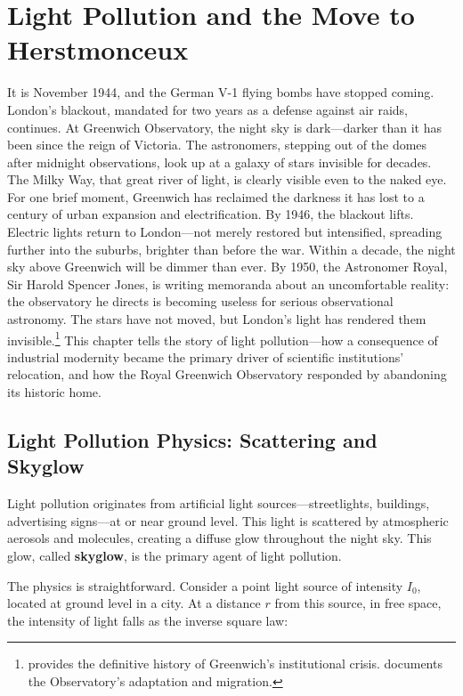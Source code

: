 \chapter{Light Pollution and the Move to Herstmonceux}
\label{ch:light-pollution-herstmonceux}

It is November 1944, and the German V-1 flying bombs have stopped coming. London's blackout, mandated for two years as a defense against air raids, continues. At Greenwich Observatory, the night sky is dark—darker than it has been since the reign of Victoria. The astronomers, stepping out of the domes after midnight observations, look up at a galaxy of stars invisible for decades. The Milky Way, that great river of light, is clearly visible even to the naked eye. For one brief moment, Greenwich has reclaimed the darkness it has lost to a century of urban expansion and electrification. By 1946, the blackout lifts. Electric lights return to London—not merely restored but intensified, spreading further into the suburbs, brighter than before the war. Within a decade, the night sky above Greenwich will be dimmer than ever. By 1950, the Astronomer Royal, Sir Harold Spencer Jones, is writing memoranda about an uncomfortable reality: the observatory he directs is becoming useless for serious observational astronomy. The stars have not moved, but London's light has rendered them invisible.\footnote{\textcite{Meadows1975} provides the definitive history of Greenwich's institutional crisis. \textcite{McCrea1992} documents the Observatory's adaptation and migration.} This chapter tells the story of light pollution—how a consequence of industrial modernity became the primary driver of scientific institutions' relocation, and how the Royal Greenwich Observatory responded by abandoning its historic home.

\section{Light Pollution Physics: Scattering and Skyglow}

Light pollution originates from artificial light sources—streetlights, buildings, advertising signs—at or near ground level. This light is scattered by atmospheric aerosols and molecules, creating a diffuse glow throughout the night sky. This glow, called \textbf{skyglow}, is the primary agent of light pollution.

The physics is straightforward. Consider a point light source of intensity $I_0$, located at ground level in a city. At a distance $r$ from this source, in free space, the intensity of light falls as the inverse square law:

